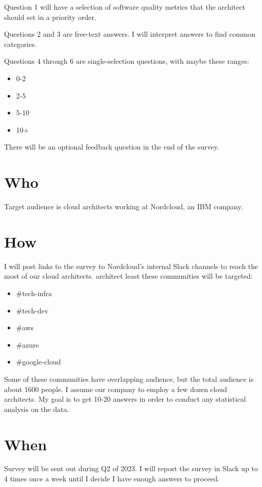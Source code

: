 \documentclass[utf8,english]{gradu3}
\begin{document}
Question 1 will have a selection of software quality metrics that the architect should set in a priority order.

Questions 2 and 3 are free-text answers.
I will interpret answers to find common categories.

Questions 4 through 6 are single-selection questions, with maybe these ranges:
\begin{itemize}
  \item 0-2
  \item 2-5
  \item 5-10
  \item 10+
\end{itemize}

There will be an optional feedback question in the end of the survey.

\section{Who}

Target audience is cloud architects working at Nordcloud, an IBM company.

\section{How}
I will post links to the survey to Nordcloud's internal Slack channels to reach
the most of our cloud architects.
architect least these communities will be targeted:
\begin{itemize}
  \item \#tech-infra
  \item \#tech-dev
  \item \#aws
  \item \#azure
  \item \#google-cloud
\end{itemize}

Some of these communities have overlapping audience, but the total audience is about 1600 people.
I assume our company to employ a few dozen cloud architects.
My goal is to get 10-20 answers in order to conduct any statistical analysis on
the data.

\section{When}
Survey will be sent out during Q2 of 2023.
I will repost the survey in Slack up to 4 times once a week until I decide I
have enough answers to proceed.
\end{document}
